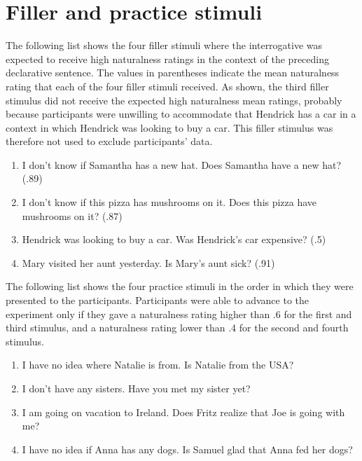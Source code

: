 \documentclass[11pt,fleqn]{article}
\newcommand{\6}{\mbox{$[\hspace*{-.6mm}[$}}
\newcommand{\9}{\mbox{$]\hspace*{-.6mm}]$}}
\begin{document}
\section{Filler and practice stimuli}\label{a:fillerPractice}

The following list shows the four filler stimuli where the interrogative was expected to receive high naturalness ratings in the context of the preceding declarative sentence. The values in parentheses indicate the mean naturalness rating that each of the four filler stimuli received. As shown, the third filler stimulus did not receive the expected high naturalness mean ratings, probably because participants were unwilling to accommodate that Hendrick has a car in a context in which Hendrick was looking to buy a car. This filler stimulus was therefore not used to exclude participants' data. 

\begin{enumerate}[leftmargin=4ex,itemsep=-2pt]

\item I don't know if Samantha has a new hat. Does Samantha have a new hat? (.89)

\item  I don't know if this pizza has mushrooms on it. Does this pizza have mushrooms on it? (.87)

\item Hendrick was looking to buy a car. Was Hendrick's car expensive? (.5)

\item Mary visited her aunt yesterday. Is Mary's aunt sick? (.91)

\end{enumerate}

\noindent
The following list shows the four practice stimuli in the order in which they were presented to the participants. Participants were able to advance to the experiment only if they gave a naturalness rating higher than .6 for the first and third stimulus, and a naturalness rating lower than .4 for the second and fourth stimulus.

\begin{enumerate}[leftmargin=4ex,itemsep=-2pt]

\item I have no idea where Natalie is from. Is Natalie from the USA?

\item I don't have any sisters. Have you met my sister yet?

\item I am going on vacation to Ireland. Does Fritz realize that Joe is going with me?

\item I have no idea if Anna has any dogs. Is Samuel glad that Anna fed her dogs?

\end{enumerate}
\end{document}
